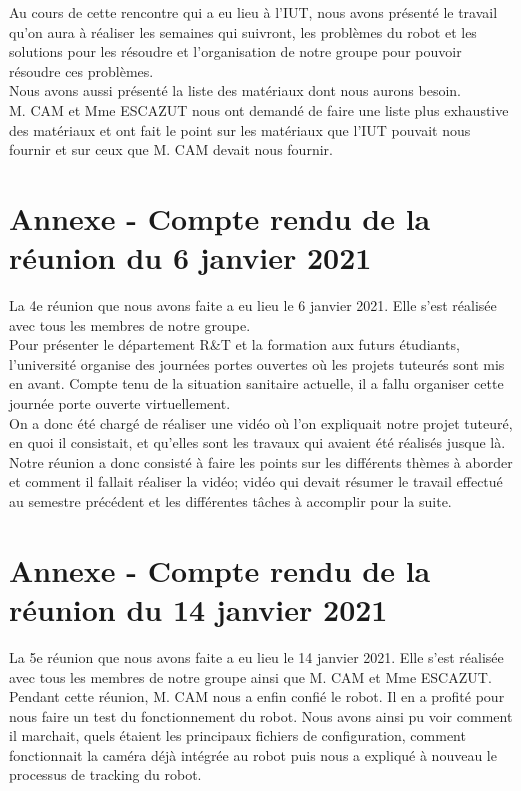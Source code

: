 \documentclass{PackagerQualityN}
\begin{document}
Au cours de cette rencontre qui a eu lieu à l'IUT, nous avons présenté le travail qu'on aura à réaliser les semaines qui suivront, les problèmes du robot et les solutions pour les résoudre et l'organisation de notre groupe pour pouvoir résoudre ces problèmes.\\

Nous avons aussi présenté la liste des matériaux dont nous aurons besoin.\\

M. CAM et Mme ESCAZUT nous ont demandé de faire une liste plus exhaustive des matériaux et ont fait le point sur les matériaux que l'IUT pouvait nous fournir et sur ceux que M. CAM devait nous fournir.


\newp
\section*{Annexe - Compte rendu de la réunion du 6 janvier 2021}
La 4e réunion que nous avons faite a eu lieu le 6 janvier 2021. Elle s'est réalisée avec tous les membres de notre groupe.\\

Pour présenter le département R\&T et la formation aux futurs étudiants, l'université organise des journées portes ouvertes où les projets tuteurés sont mis en avant. Compte tenu de la situation sanitaire actuelle, il a fallu organiser cette journée porte ouverte virtuellement.\\

On a donc été chargé de réaliser une vidéo où l'on expliquait notre projet tuteuré, en quoi il consistait, et qu'elles sont les travaux qui avaient été réalisés jusque là.\\

Notre réunion a donc consisté à faire les points sur les différents thèmes à aborder et comment il fallait réaliser la vidéo; vidéo qui devait résumer le travail effectué au semestre précédent et  les différentes tâches à accomplir pour la suite.
\newp
\section*{Annexe - Compte rendu de la réunion du 14 janvier 2021}
La 5e réunion que nous avons faite a eu lieu le 14 janvier 2021. Elle s'est réalisée avec tous les membres de notre groupe ainsi que M. CAM et Mme ESCAZUT.\\

Pendant cette réunion, M. CAM nous a enfin confié le robot. Il en a profité pour nous faire un test du fonctionnement du robot. Nous avons ainsi pu voir comment il marchait, quels étaient les principaux fichiers de configuration, comment fonctionnait la caméra déjà intégrée au robot puis nous a expliqué à nouveau le processus de tracking du robot.\\
\end{document}

